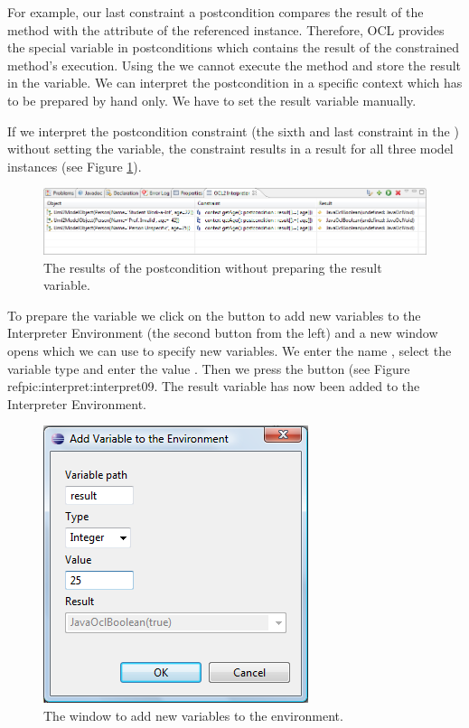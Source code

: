 For example, our last constraint a postcondition compares the result of the method  with the attribute  of the referenced  instance. Therefore, \acs{OCL} provides the special variable  in postconditions which contains the result of the constrained method's execution. Using the  we cannot execute the method  and store the result in the  variable. We can interpret the postcondition in a specific context which has to be prepared by hand only. We have to set the result variable manually.

If we interpret the postcondition constraint (the sixth and last constraint in the ) without setting the  variable, the constraint results in a  result for all three model instances (see Figure \ref{pic:interpret:interpret08}).

\begin{figure}[!htbp]
	\centering
	\includegraphics[width=1.0\linewidth]{figures/interpreter/interpret08}
	\caption{The results of the postcondition without preparing the result variable.}
	\label{pic:interpret:interpret08}
\end{figure}

To prepare the variable we click on the button to add new variables to the Interpreter Environment (the second button from the left) and a new window opens which we can use to specify new variables. We enter the name , select the variable type  and enter the value . Then we press the  button (see Figure ref{pic:interpret:interpret09}. The result variable has now been added to the Interpreter Environment.

\begin{figure}[!htbp]
	\centering
	\includegraphics[width=0.5\linewidth]{figures/interpreter/interpret09}
	\caption{The window to add new variables to the environment.}
	\label{pic:interpret:interpret09}
\end{figure}

